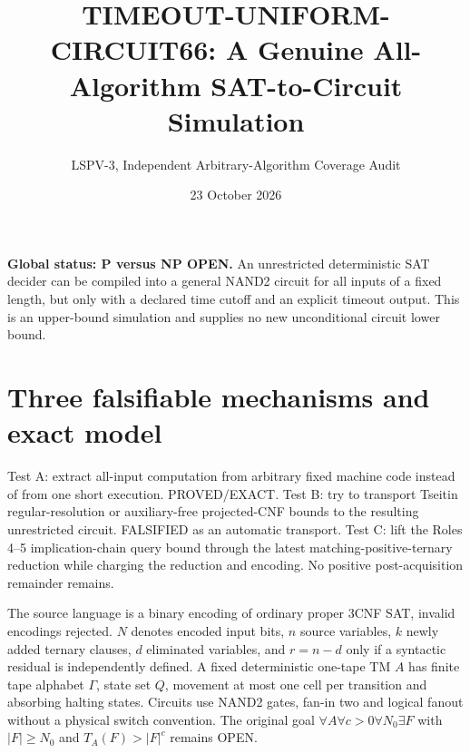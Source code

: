 \documentclass[10pt]{article}
\title{TIMEOUT-UNIFORM-CIRCUIT66: A Genuine All-Algorithm SAT-to-Circuit Simulation}
\author{LSPV-3, Independent Arbitrary-Algorithm Coverage Audit}
\date{23 October 2026}
\begin{document}
\maketitle
\noindent\textbf{Global status: P versus NP OPEN.} An unrestricted deterministic SAT decider can be compiled into a general NAND2 circuit for all inputs of a fixed length, but only with a declared time cutoff and an explicit timeout output. This is an upper-bound simulation and supplies no new unconditional circuit lower bound.

\section{Three falsifiable mechanisms and exact model}
Test A: extract all-input computation from arbitrary fixed machine code instead of from one short execution. PROVED/EXACT. Test B: try to transport Tseitin regular-resolution or auxiliary-free projected-CNF bounds to the resulting unrestricted circuit. FALSIFIED as an automatic transport. Test C: lift the Roles 4--5 implication-chain query bound through the latest matching-positive-ternary reduction while charging the reduction and encoding. No positive post-acquisition remainder remains.

The source language is a binary encoding of ordinary proper 3CNF SAT, invalid encodings rejected. $N$ denotes encoded input bits, $n$ source variables, $k$ newly added ternary clauses, $d$ eliminated variables, and $r=n-d$ only if a syntactic residual is independently defined. A fixed deterministic one-tape TM $A$ has finite tape alphabet $\Gamma$, state set $Q$, movement at most one cell per transition and absorbing halting states. Circuits use NAND2 gates, fan-in two and logical fanout without a physical switch convention. The original goal $\forall A\forall c>0\forall N_0\exists F$ with $|F|\ge N_0$ and $T_A(F)>|F|^c$ remains OPEN.
\end{document}
